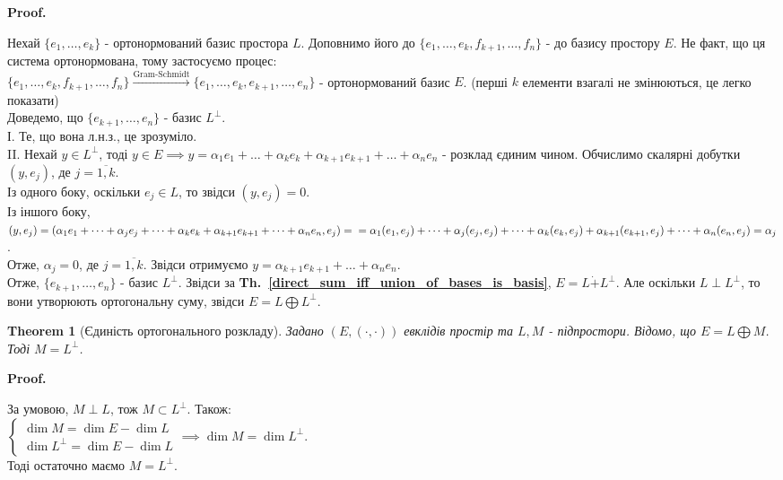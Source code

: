 \documentclass[a4paper, 10pt]{article}
\makeatletter
\theoremstyle{theoremdd}
\newtheorem{theorem}{Theorem}[subsection]
\newcommand\thref[1]{\textbf{Th.~\ref{#1}}}
\renewenvironment{proof}[1][Proof.\\]{\par
\pushQED{\hfill \qed}%
\normalfont \topsep6\p@\@plus6\p@\relax
\trivlist
\item\relax
{\bfseries
#1\@addpunct{.}}\hspace\labelsep\ignorespaces
}{%
\popQED\endtrivlist\@endpefalse
}
\makeatother
\begin{document}
\begin{proof}
Нехай $\{e_1,\dots,e_k\}$ - ортонормований базис простора $L$. Доповнимо його до $\{e_1,\dots,e_k,f_{k+1},\dots,f_n\}$ - до базису простору $E$. Не факт, що ця система ортонормована, тому застосуємо процес:\\
$\{e_1,\dots,e_k,f_{k+1},\dots, f_n\} \xrightarrow{\text{Gram-Schmidt}} \{e_1,\dots,e_k, e_{k+1},\dots,e_n\}$ - ортонормований базис $E$. (перші $k$ елементи взагалі не змінюються, це легко показати)\\
Доведемо, що $\{e_{k+1},\dots, e_n\}$ - базис $L^\perp$.\\
І. Те, що вона л.н.з., це зрозуміло.\\
II. Нехай $y \in L^\perp$, тоді $y \in E \implies y = \alpha_1 e_1 + \dots + \alpha_k e_k + \alpha_{k+1} e_{k+1} + \dots + \alpha_n e_n$ - розклад єдиним чином. Обчислимо скалярні добутки $(y,e_j)$, де $j=\overline{1,k}$.\\
Із одного боку, оскільки $e_j \in L$, то звідси $(y,e_j) = 0$.\\
Із іншого боку, $(y,e_j) = (\alpha_1 e_1 + \dots + \alpha_j e_j + \dots + \alpha_k e_k + \alpha_{k+1} e_{k+1} + \dots + \alpha_n e_n, e_j) = \\
= \alpha_1 (e_1,e_j) + \dots + \alpha_j (e_j,e_j) + \dots + \alpha_k (e_k,e_j) + \alpha_{k+1} (e_{k+1},e_j) + \dots + \alpha_n (e_n,e_j) = \alpha_j$.\\
Отже, $\alpha_j = 0$, де $j=\overline{1,k}$. Звідси отримуємо $y = \alpha_{k+1} e_{k+1} + \dots + \alpha_n e_n$.\\
Отже, $\{e_{k+1},\dots, e_n\}$ - базис $L^\perp$. Звідси за \thref{direct_sum_iff_union_of_bases_is_basis}, $E= L \dot{+} L^{\perp}$. Але оскільки $L \perp L^\perp$, то вони утворюють ортогональну суму, звідси $E = L \bigoplus L^\perp$.
\end{proof}

\begin{theorem}[Єдиність ортогонального розкладу]
Задано $(E,(\cdot,\cdot))$  евклідів простір та $L,M$ - підпростори. Відомо, що $E = L \bigoplus M$. Тоді $M = L^\perp$.
\end{theorem}

\begin{proof}
За умовою, $M \perp L$, тож $M \subset L^{\perp}$. Також:\\
$\begin{cases}
\dim M = \dim E - \dim L \\
\dim L^{\perp} = \dim E - \dim L
\end{cases} \implies \dim M = \dim L^\perp$.\\
Тоді остаточно маємо $M = L^\perp$.
\end{proof}
\end{document}
